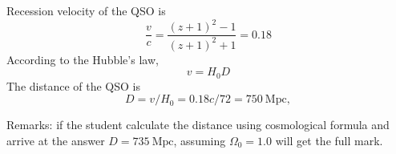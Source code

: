 Recession velocity of the QSO is
\begin{equation*}
\frac{v}{c} = \frac{(z+1)^2 - 1}{(z+1)^2 + 1} = 0.18 \tag*{4}
\end{equation*}
According to the Hubble's law,
\begin{equation*}
v = H_0 D \tag*{2}
\end{equation*}
The distance of the QSO is
\begin{equation*}
D = v/H_0 = 0.18c/72 = 750~\mathrm{Mpc}, \tag*{4}
\end{equation*}

Remarks: if the student calculate the distance using cosmological formula and
arrive at the answer $D = 735~\mathrm{Mpc}$, assuming $\Omega_0 = 1.0$ will
get the full mark.
